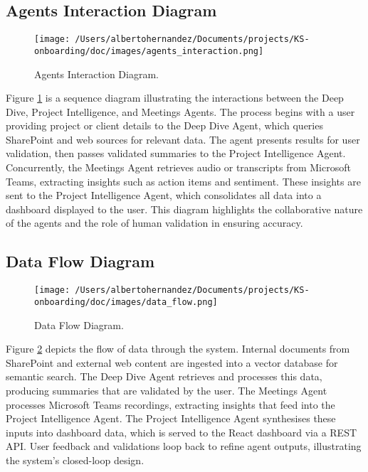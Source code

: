 \documentclass{article}
\begin{document}
\subsection{Agents Interaction Diagram}
\begin{figure}[h]
    \centering
    \texttt{[image: /Users/albertohernandez/Documents/projects/KS-onboarding/doc/images/agents\_interaction.png]}
    \caption{Agents Interaction Diagram.}
    \label{fig:agents_interaction}
\end{figure}
Figure \ref{fig:agents_interaction} is a sequence diagram illustrating the interactions between the Deep Dive, Project Intelligence, and Meetings Agents. The process begins with a user providing project or client details to the Deep Dive Agent, which queries SharePoint and web sources for relevant data. The agent presents results for user validation, then passes validated summaries to the Project Intelligence Agent. Concurrently, the Meetings Agent retrieves audio or transcripts from Microsoft Teams, extracting insights such as action items and sentiment. These insights are sent to the Project Intelligence Agent, which consolidates all data into a dashboard displayed to the user. This diagram highlights the collaborative nature of the agents and the role of human validation in ensuring accuracy.

\subsection{Data Flow Diagram}
\begin{figure}[h]
    \centering
    \texttt{[image: /Users/albertohernandez/Documents/projects/KS-onboarding/doc/images/data\_flow.png]}
    \caption{Data Flow Diagram.}
    \label{fig:data_flow}
\end{figure}
Figure \ref{fig:data_flow} depicts the flow of data through the system. Internal documents from SharePoint and external web content are ingested into a vector database for semantic search. The Deep Dive Agent retrieves and processes this data, producing summaries that are validated by the user. The Meetings Agent processes Microsoft Teams recordings, extracting insights that feed into the Project Intelligence Agent. The Project Intelligence Agent synthesises these inputs into dashboard data, which is served to the React dashboard via a REST API. User feedback and validations loop back to refine agent outputs, illustrating the system’s closed-loop design.
\end{document}
